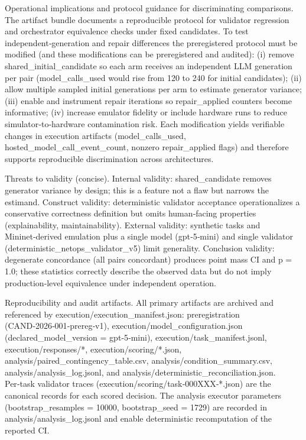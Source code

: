 \documentclass[conference]{IEEEtran}
\begin{document}
Operational implications and protocol guidance for discriminating comparisons. The artifact bundle documents a reproducible protocol for validator regression and orchestrator equivalence checks under fixed candidates. To test independent‑generation and repair differences the preregistered protocol must be modified (and these modifications can be preregistered and audited): (i) remove shared\_initial\_candidate so each arm receives an independent LLM generation per pair (model\_calls\_used would rise from 120 to 240 for initial candidates); (ii) allow multiple sampled initial generations per arm to estimate generator variance; (iii) enable and instrument repair iterations so repair\_applied counters become informative; (iv) increase emulator fidelity or include hardware runs to reduce simulator‑to‑hardware contamination risk. Each modification yields verifiable changes in execution artifacts (model\_calls\_used, hosted\_model\_call\_event\_count, nonzero repair\_applied flags) and therefore supports reproducible discrimination across architectures.

Threats to validity (concise). Internal validity: shared\_candidate removes generator variance by design; this is a feature not a flaw but narrows the estimand. Construct validity: deterministic validator acceptance operationalizes a conservative correctness definition but omits human‑facing properties (explainability, maintainability). External validity: synthetic tasks and Mininet‑derived emulation plus a single model (gpt‑5‑mini) and single validator (deterministic\_netops\_validator\_v5) limit generality. Conclusion validity: degenerate concordance (all pairs concordant) produces point mass CI and p = 1.0; these statistics correctly describe the observed data but do not imply production‑level equivalence under independent operation.

Reproducibility and audit artifacts. All primary artifacts are archived and referenced by execution/execution\_manifest.json: preregistration (CAND‑2026‑001‑prereg‑v1), execution/model\_configuration.json (declared\_model\_version = gpt‑5‑mini), execution/task\_manifest.jsonl, execution/responses/*, execution/scoring/*.json, analysis/paired\_contingency\_table.csv, analysis/condition\_summary.csv, analysis/analysis\_log.jsonl, and analysis/deterministic\_reconciliation.json. Per‑task validator traces (execution/scoring/task‑000XXX‑*.json) are the canonical records for each scored decision. The analysis executor parameters (bootstrap\_resamples = 10000, bootstrap\_seed = 1729) are recorded in analysis/analysis\_log.jsonl and enable deterministic recomputation of the reported CI.
\end{document}
